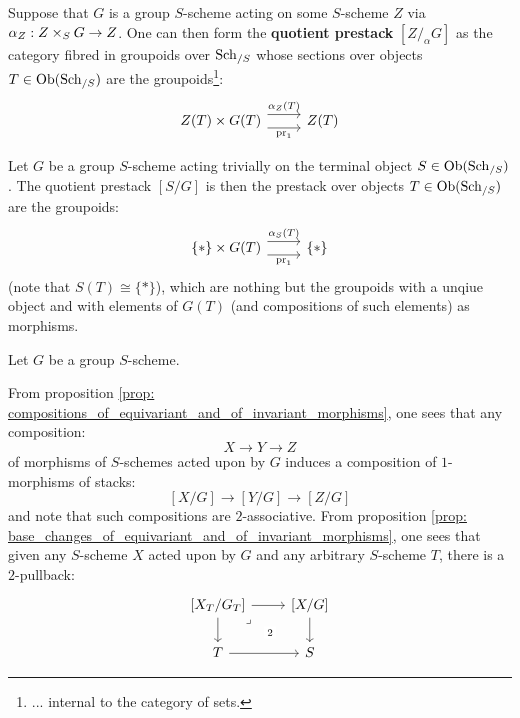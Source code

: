         \begin{definition} \label{def: quotient_prestacks}
            Suppose that $G$ is a group $S$-scheme acting on some $S$-scheme $Z$ via $\alpha_Z: Z \x_S G \to Z$. One can then form the \textbf{quotient prestack} $[Z/_{\alpha}G]$ as the category fibred in groupoids over $\mathrm{Sch}_{/S}$ whose sections over objects $T \in \mathrm{Ob}(\mathrm{Sch}_{/S})$ are the groupoids\footnote{... internal to the category of sets.}:
                $$
                    \begin{tikzcd}
                	{Z(T) \x G(T)} & {Z(T)}
                	\arrow["{\pr_1}"', shift right=2, from=1-1, to=1-2]
                	\arrow["{\alpha_Z(T)}", shift left=2, from=1-1, to=1-2]
                    \end{tikzcd}
                $$
        \end{definition}
        \begin{example}
            Let $G$ be a group $S$-scheme acting trivially on the terminal object $S \in \mathrm{Ob}(\mathrm{Sch}_{/S})$. The quotient prestack $[S/G]$ is then the prestack over objects $T \in \mathrm{Ob}(\mathrm{Sch}_{/S})$ are the groupoids:
                $$
                    \begin{tikzcd}
                	{\{*\} \x G(T)} & {\{*\}}
                	\arrow["{\pr_1}"', shift right=2, from=1-1, to=1-2]
                	\arrow["{\alpha_S(T)}", shift left=2, from=1-1, to=1-2]
                    \end{tikzcd}
                $$
            (note that $S(T) \cong \{*\}$), which are nothing but the groupoids with a unqiue object and with elements of $G(T)$ (and compositions of such elements) as morphisms. 
        \end{example}
        \begin{remark}
            Let $G$ be a group $S$-scheme.
        
            From proposition \ref{prop: compositions_of_equivariant_and_of_invariant_morphisms}, one sees that any composition:
                $$X \to Y \to Z$$
            of morphisms of $S$-schemes acted upon by $G$ induces a composition of $1$-morphisms of stacks:
                $$[X/G] \to [Y/G] \to [Z/G]$$
            and note that such compositions are $2$-associative. From proposition \ref{prop: base_changes_of_equivariant_and_of_invariant_morphisms}, one sees that given any $S$-scheme $X$ acted upon by $G$ and any arbitrary $S$-scheme $T$, there is a $2$-pullback:
                $$
                    \begin{tikzcd}
                	{[X_T/G_T]} & {[X/G]} \\
                	T & S
                	\arrow[from=1-2, to=2-2]
                	\arrow[from=2-1, to=2-2]
                	\arrow[from=1-1, to=2-1]
                	\arrow[from=1-1, to=1-2]
                	\arrow["2"{description}, "\lrcorner"{anchor=center, pos=0.125}, draw=none, from=1-1, to=2-2]
                    \end{tikzcd}
                $$
        \end{remark}
